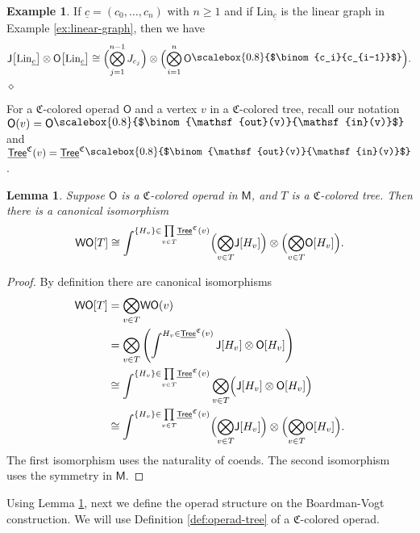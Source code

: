 \documentclass[11pt]{amsbook}
\numberwithin{section}{chapter}
\numberwithin{subsection}{section}
\numberwithin{equation}{section}
\theoremstyle{plain}
\newtheorem{lemma}[equation]{Lemma}
\theoremstyle{definition}
\newtheorem{example}[equation]{Example}
\newcommand{\colorc}{\mathfrak{C}}
\newcommand{\Lin}{\mathrm{Lin}}
\newcommand{\J}{\mathsf{J}}
\newcommand{\M}{\mathsf{M}}
\renewcommand{\O}{\mathsf{O}}
\newcommand{\W}{\mathsf{W}}
\newcommand{\prodover}[1]{\underset{#1}{\prod}}
\newcommand{\bigtensorover}[1]{\underset{#1}{\bigotimes}}
\newcommand{\dqed}{\hfill$\diamond$}
\newcommand{\Tree}{\mathsf{Tree}}
\newcommand{\uTree}{\underline{\Tree}}
\newcommand{\uTreec}{\uTree^{\colorc}}
\newcommand{\wo}{\W\O}
\newcommand{\uc}{\underline c}
\newcommand{\sbinom}[2]{\raisebox{.05cm}{\scalebox{0.8}{$\binom{#1}{#2}$}}}
\newcommand{\inout}[1]{\raisebox{.05cm}{\scalebox{0.8}{$\binom{\out(#1)}{\inp(#1)}$}}}
\newcommand{\inoutv}{\inout{v}}
\newcommand{\inp}{\mathsf{in}}
\newcommand{\out}{\mathsf{out}}
\begin{document}
\begin{example}\label{ex:jo-linear}
If $\uc = (c_0,\ldots,c_n)$ with $n\geq 1$ and if $\Lin_{\uc}$ is the linear graph in Example \ref{ex:linear-graph}, then we have
\[\J\bigl[\Lin_{\uc}\bigr] \otimes \O\bigl[\Lin_{\uc}\bigr] \cong \Bigl(\bigotimes\limits_{j=1}^{n-1} J_{c_j}\Bigr) \otimes \Bigl(\bigotimes\limits_{i=1}^n\O\sbinom{c_i}{c_{i-1}}\Bigr).\]\dqed
\end{example}

For a $\colorc$-colored operad $\O$ and a vertex $v$ in a $\colorc$-colored tree, recall our notation $\O(v) = \O\inoutv$ and $\uTreec(v) = \uTreec\inoutv$.

\begin{lemma}\label{lem:wo-of-t}
Suppose $\O$ is a $\colorc$-colored operad in $\M$, and $T$ is a $\colorc$-colored tree.  Then there is a canonical isomorphism
\[\wo[T] \cong \int^{\{H_v\}\in \prodover{v\in T} \uTreec(v)} \Bigl(\bigtensorover{v\in T} \J[H_v]\Bigr) \otimes \Bigl(\bigtensorover{v\in T} \O[H_v]\Bigr).\]
\end{lemma}

\begin{proof}
By definition there are canonical isomorphisms
\[\begin{split} \wo[T] &= \bigtensorover{v\in T} \wo(v)\\
&= \bigtensorover{v\in T} \left(\int^{H_v\in\uTreec(v)} \J[H_v] \otimes \O[H_v]\right)\\
&\cong\int^{\{H_v\}\in \prodover{v\in T} \uTreec(v)} \bigtensorover{v\in T} \Bigl(\J[H_v]\otimes \O[H_v]\Bigr)\\
&\cong \int^{\{H_v\}\in \prodover{v\in T} \uTreec(v)} \Bigl(\bigtensorover{v\in T} \J[H_v]\Bigr) \otimes \Bigl(\bigtensorover{v\in T} \O[H_v]\Bigr).\end{split}\]
The first isomorphism uses the naturality of coends.  The second isomorphism uses the symmetry in $\M$.
\end{proof}

Using Lemma \ref{lem:wo-of-t}, next we define the operad structure on the Boardman-Vogt construction.  We will use Definition \ref{def:operad-tree} of a $\colorc$-colored operad.
\end{document}
